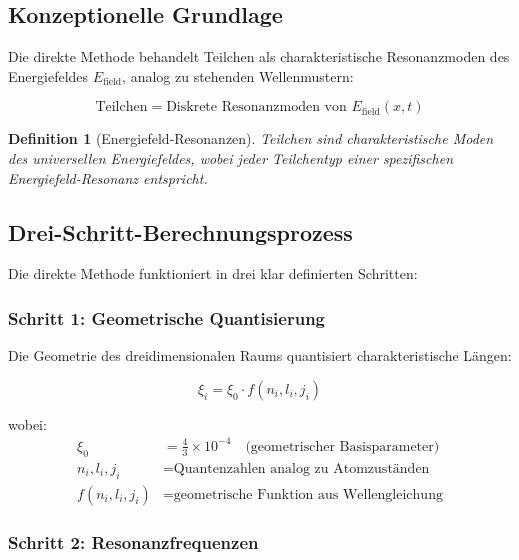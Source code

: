 \documentclass[12pt,a4paper]{article}
\newcommand{\Efield}{E_{\text{field}}}
\newtheorem{definition}[theorem]{Definition}
\begin{document}
	\subsection{Konzeptionelle Grundlage}
	\label{subsec:direct_principles}
	
	Die direkte Methode behandelt Teilchen als charakteristische Resonanzmoden des Energiefeldes $\Efield$, analog zu stehenden Wellenmustern:
	
	\begin{equation}
		\text{Teilchen} = \text{Diskrete Resonanzmoden von } \Efield(x,t)
	\end{equation}
	
	\begin{definition}[Energiefeld-Resonanzen]
		Teilchen sind charakteristische Moden des universellen Energiefeldes, wobei jeder Teilchentyp einer spezifischen Energiefeld-Resonanz entspricht.
	\end{definition}
	
	\subsection{Drei-Schritt-Berechnungsprozess}
	\label{subsec:three_step_process}
	
	Die direkte Methode funktioniert in drei klar definierten Schritten:
	
	\subsubsection{Schritt 1: Geometrische Quantisierung}
	\label{subsubsec:step1}
	
	Die Geometrie des dreidimensionalen Raums quantisiert charakteristische Längen:
	
	\begin{equation}
		\xi_i = \xi_0 \cdot f(n_i, l_i, j_i)
		\label{eq:geometric_quantization}
	\end{equation}
	
	wobei:
	\begin{align}
		\xi_0 &= \frac{4}{3} \times 10^{-4} \quad \text{(geometrischer Basisparameter)} \\
		n_i, l_i, j_i &= \text{Quantenzahlen analog zu Atomzuständen} \\
		f(n_i, l_i, j_i) &= \text{geometrische Funktion aus Wellengleichung}
	\end{align}
	
	\subsubsection{Schritt 2: Resonanzfrequenzen}
	\label{subsubsec:step2}
	
\end{document}

